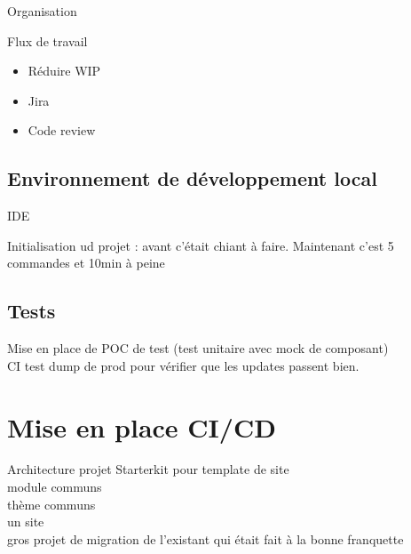 \begin{frame}{Organisation}
	\begin{block}{Flux de travail}
		\begin{itemize}
			\item Réduire WIP
			\item Jira
			\item Code review
		\end{itemize}
	\end{block}

\end{frame}

\subsection[Développement]{Environnement de développement local}
\begin{frame}{\subsecname}
	IDE
	
	Initialisation ud projet : avant c'était chiant à faire. Maintenant c'est 5 commandes et 10min à peine
\end{frame}

\subsection{Tests}
\begin{frame}{\subsecname}
	Mise en place de POC de test (test unitaire avec mock de composant) \\
	CI test dump de prod pour vérifier que les updates passent bien.
\end{frame}

\section{Mise en place CI/CD}
\begin{frame}{Architecture projet}
	Starterkit pour template de site
	 \\
	 module communs
	 \\
	 thème communs
	 \\
	 un site 
	 \\ gros projet de migration de l'existant qui était fait à la bonne franquette
\end{frame}

